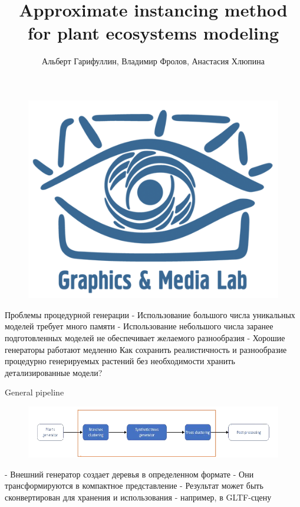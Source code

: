 \documentclass[14pt]{beamer}
\author{Альберт Гарифуллин,\linebreak	 
Владимир Фролов,\linebreak	
Анастасия Хлюпина}
\title{Approximate instancing method for plant ecosystems modeling}
\institute{ВМК МГУ, Лаборатория Компьютерной графики и Мультимедиа}
\begin{document}
\begin{frame}
\begin{figure}[t!]\includegraphics[scale=0.2]{logo.png}\end{figure}
\titlepage
\end{frame}

  
\begin{frame}{Проблемы процедурной генерации}
 - Использование большого числа уникальных моделей требует много памяти\linebreak	
 - Использование небольшого числа заранее подготовленных моделей не обеспечивает желаемого разнообразия\linebreak	
 - Хорошие генераторы работают медленно\linebreak
 Как сохранить реалистичность и разнообразие процедурно генерируемых растений без необходимости хранить детализированные модели?
\end{frame}

\begin{frame}{General pipeline}
\begin{figure}[hbtp]
\includegraphics[scale=0.57]{pipeline.png}
\end{figure}
- Внешний генератор создает деревья в определенном формате\linebreak	
- Они трансформируются в компактное представление\linebreak	
- Результат может быть сконвертирован для хранения и использования - например, в GLTF-сцену\linebreak	
\end{frame}
\end{document}
